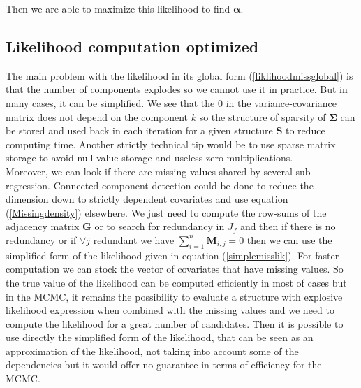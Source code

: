 \documentclass[12pt,a4paper]{report}
\begin{document}
Then we are able to maximize this likelihood to find $\boldsymbol{\alpha}$.
	\subsection{Likelihood computation optimized}
	The main problem with the likelihood in its global form (\ref{liklihoodmissglobal}) is that the number of components explodes so we cannot use it in practice. But in many cases, it can be simplified.
We see that the $0$ in the variance-covariance matrix does not depend on the component $k$ so the structure of sparsity of $\boldsymbol{\Sigma}$ can be stored and used back in each iteration for a given structure $\boldsymbol{S}$ to reduce computing time.  Another strictly technical tip would be to use sparse matrix storage to avoid null value storage and useless zero multiplications.\\

		Moreover, we can look if there are missing values shared by several sub-regression. 
		Connected component detection could be done to reduce the dimension down to strictly dependent covariates and use equation (\ref{Missingdensity}) elsewhere.
		We just need to compute the  row-sums of the adjacency matrix $\boldsymbol{G}$ or to search for redundancy in $J_f$ and then if there is no redundancy or if $\forall j$ redundant we have $\sum_{i=1}^n\boldsymbol{M}_{i,j}=0$ then we can use the simplified form of the likelihood given in equation (\ref{simplemisslik}). For faster computation we can stock the vector of covariates that have missing values.
		So the true value of the likelihood can be computed efficiently in most of cases but in the MCMC, it remains the possibility to evaluate a structure with explosive likelihood expression when combined with the missing values and we need to compute the likelihood for a great number of candidates. Then it is possible to use directly the simplified form of the likelihood, that can be seen as an approximation of the likelihood, not taking into account some of the dependencies but it would offer no guarantee in terms of efficiency for the MCMC. %
\end{document}
